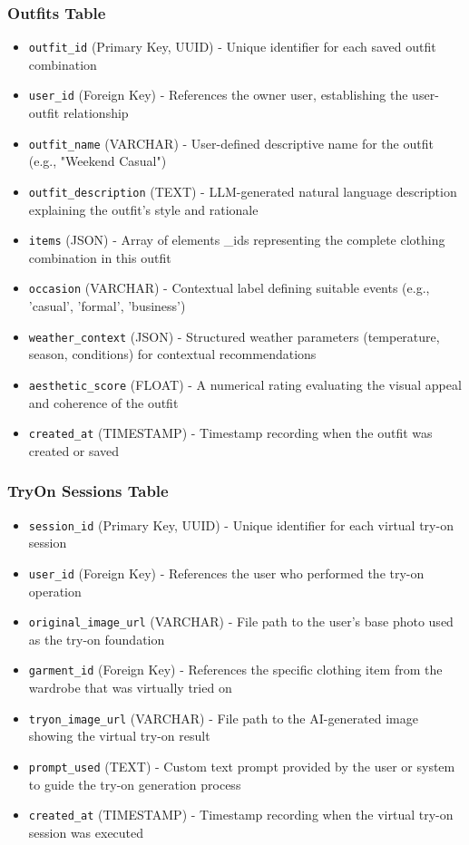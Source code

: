 \subsubsection{Outfits Table}
\begin{itemize}
    \item \texttt{outfit\_id} (Primary Key, UUID) - Unique identifier for each saved outfit combination
    \item \texttt{user\_id} (Foreign Key) - References the owner user, establishing the user-outfit relationship
    \item \texttt{outfit\_name} (VARCHAR) - User-defined descriptive name for the outfit (e.g., "Weekend Casual")
    \item \texttt{outfit\_description} (TEXT) - LLM-generated natural language description explaining the outfit's style and rationale
    \item \texttt{items} (JSON) - Array of elements \_ids representing the complete clothing combination in this outfit
    \item \texttt{occasion} (VARCHAR) - Contextual label defining suitable events (e.g., 'casual', 'formal', 'business')
    \item \texttt{weather\_context} (JSON) - Structured weather parameters (temperature, season, conditions) for contextual recommendations
    \item \texttt{aesthetic\_score} (FLOAT) - A numerical rating evaluating the visual appeal and coherence of the outfit
    \item \texttt{created\_at} (TIMESTAMP) - Timestamp recording when the outfit was created or saved
\end{itemize}

\subsubsection{TryOn Sessions Table}
\begin{itemize}
    \item \texttt{session\_id} (Primary Key, UUID) - Unique identifier for each virtual try-on session
    \item \texttt{user\_id} (Foreign Key) - References the user who performed the try-on operation
    \item \texttt{original\_image\_url} (VARCHAR) - File path to the user's base photo used as the try-on foundation
    \item \texttt{garment\_id} (Foreign Key) - References the specific clothing item from the wardrobe that was virtually tried on
    \item \texttt{tryon\_image\_url} (VARCHAR) - File path to the AI-generated image showing the virtual try-on result
    \item \texttt{prompt\_used} (TEXT) - Custom text prompt provided by the user or system to guide the try-on generation process
    \item \texttt{created\_at} (TIMESTAMP) - Timestamp recording when the virtual try-on session was executed
\end{itemize}

